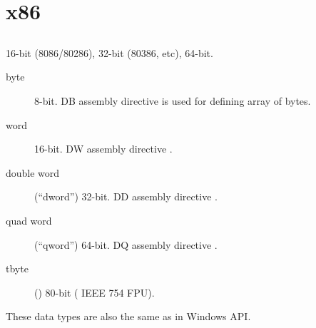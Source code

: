\section{x86}

\subsection{}

 16-bit (8086/80286), 32-bit (80386, etc), 64-bit.

\begin{description}
	\item[byte] 8-bit. 
		{DB assembly directive is used for defining array of bytes}.
	\item[word] 16-bit. 
		{DW assembly directive \dittoclosing{}}.
	\item[double word] (``dword'') 32-bit. 
		{DD assembly directive \dittoclosing{}}.
	\item[quad word] (``qword'') 64-bit. 
		{DQ assembly directive \dittoclosing{}}.
	\item[tbyte] () 80-bit   
		( IEEE 754 FPU).
\end{description}

{These data types are also the same as in} Windows \ac{API}.

